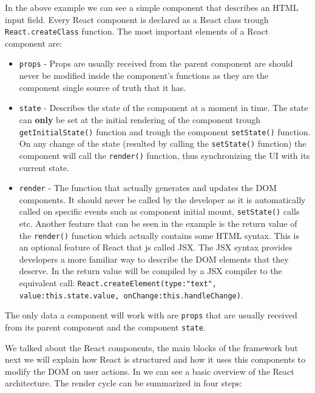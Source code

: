 In the above example we can see a simple component that describes an HTML input field. Every React component is declared as a React class trough \texttt{React.createClass} function. The most important elements of a React component are:
\begin{itemize}
	\item \texttt{props} - Props are usually received from the parent component are should never be modified inside the component's functions as they are the component single source of truth that it has.
	\item \texttt{state} - Describes the state of the component at a moment in time. The state can \textbf{only} be set at the initial rendering of the component trough \texttt{getInitialState()} function and trough the component \texttt{setState()} function. On any change of the state (resulted by calling the \texttt{setState()} function) the component will call the \texttt{render()} function, thus synchronizing the UI with its current state.
	\item \texttt{render} - The function that actually generates and updates the DOM components. It should never be called by the developer as it is automatically called on specific events such as component initial mount, \texttt{setState()} calls etc. Another feature that can be seen in the example is the return value of the \texttt{render()} function which actually contains some HTML syntax. This is an optional feature of React that js called JSX. The JSX syntax provides developers a more familiar way to describe the DOM elements that they deserve. In  the return value will be compiled by a JSX compiler to the equivalent call:
	\texttt{React.createElement(type:"text", value:this.state.value, onChange:this.handleChange)}.
\end{itemize}

The only data a component will work with are \texttt{props} that are  usually received from its parent component and the component \texttt{state}.

We talked about the React components, the main blocks of the framework but next we will explain how React is structured and how it uses this components to modify the DOM on user actions. In  we can see a basic overview of the React architecture. The render cycle can be summarized in four steps:

